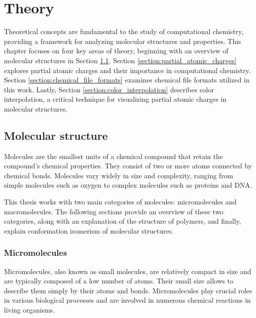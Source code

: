 \documentclass[
  digital,     %
  oneside,     %
  nosansbold,  %
  nocolorbold, %
  lof,         %
  lot,         %
]{fithesis4}
\begin{document}
\newpage
\chapter{Theory}
\label{chapter:theory}

Theoretical concepts are fundamental to the study of computational chemistry, providing a framework for analyzing molecular structures and properties. This chapter focuses on four key areas of theory, beginning with an overview of molecular structures in Section \ref{section:molecular_structure}. Section \ref{section:partial_atomic_charges} explores partial atomic charges and their importance in computational chemistry. Section \ref{section:chemical_file_formats} examines chemical file formats utilized in this work. Lastly, Section \ref{section:color_interpolation} describes color interpolation, a critical technique for visualizing partial atomic charges in molecular structures.

\section{Molecular structure}
\label{section:molecular_structure}

Molecules are the smallest units of a chemical compound that retain the compound's chemical properties. They consist of two or more atoms connected by chemical bonds. Molecules vary widely in size and complexity, ranging from simple molecules such as oxygen to complex molecules such as proteins and DNA. \cite{britannica_molecule}

This thesis works with two main categories of molecules: micromolecules and macromolecules. The following sections provide an overview of these two categories, along with an explanation of the structure of polymers, and finally, explain conformation isomerism of molecular structures.

\subsection{Micromolecules}


Micromolecules, also known as small molecules, are relatively compact in size and are typically composed of a low number of atoms. Their small size allows to describe them simply by their atoms and bonds. Micromolecules play crucial roles in various biological processes and are involved in numerous chemical reactions in living organisms. 
\end{document}
